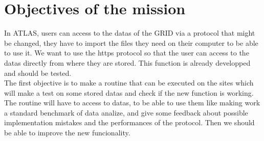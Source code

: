 \section{Objectives of the mission}

In ATLAS, users can access to the datas of the GRID via a protocol that might be changed, they have to import the files they need on their computer to be able to use it. We want to use the https protocol so that the user can access to the datas directly from where they are stored. This function is already developped and should be tested.\\

The first objective is to make a routine that can be executed on the sites which will make a test on some stored datas and check if the new function is working. The routine will have to access to datas, to be able to use them like making work a standard benchmark of data analize, and give some feedback about possible implementation mistakes and the performances of the protocol. Then we should be able to improve the new funcionality.\\


